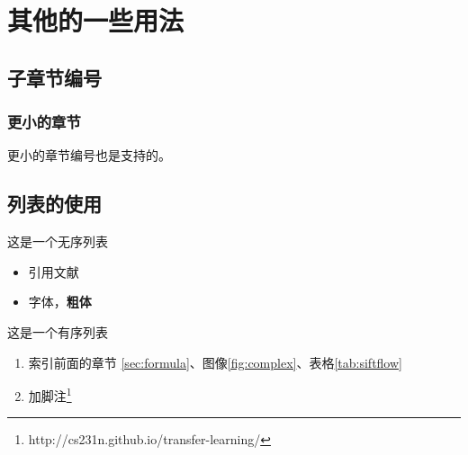 \section{其他的一些用法}
\label{sec:font}
\subsection{子章节编号}
\label{sec:font:subsection}
\subsubsection{更小的章节}
\label{sec:font:subsection:subsub}
更小的章节编号也是支持的。

\subsection{列表的使用}
\label{src:font:list}

这是一个无序列表
\begin{itemize}
	\item 引用文献\cite{long2015fully}
	\item 字体{\color{red}{变红}}，\textbf{粗体}
\end{itemize}

这是一个有序列表
\begin{enumerate}
	\item 索引前面的章节 \ref{sec:formula}、图像\ref{fig:complex}、表格\ref{tab:siftflow}
	\item 加脚注\footnote{http://cs231n.github.io/transfer-learning/}
\end{enumerate}



